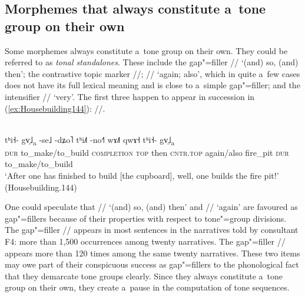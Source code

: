 \subsection[Morphemes that constitute a~tone group on their own]{Morphemes that always constitute a~tone group on their own}
\label{sec:someelementsalwaysconstituteatonegroupontheirown}

Some morphemes always constitute a~tone group on their own. They could be referred to as \textit{tonal standalones}. These include the gap"=filler //
‘(and) so, (and) then’; the
contrastive topic marker //; // ‘again; also’, which in quite a~few cases does not have its full
lexical meaning and is close to a~simple gap"=filler; and the intensifier // ‘very’. The first three happen to appear in succession in (\ref{ex:Housebuilding144}): //.

\begin{exe}
	\ex
	\label{ex:Housebuilding144}
	\\
	\gll tʰi˧-		gv̩˩\textsubscript{a}	-se˩	-dʑo˥	tʰi˩˥	-no˧˥	wɤ˩˥		qwɤ˧	tʰi˧-	gv̩˩\textsubscript{a}\\
	\textsc{dur}		to\_make/to\_build	\textsc{completion}			\textsc{top}	then	\textsc{cntr.top}		again/also	fire\_pit		\textsc{dur}	to\_make/to\_build\\
	\glt ‘After one has finished to build [the cupboard], well, one builds the fire pit!’ (Housebuilding.144)
\end{exe}

One could speculate that // ‘(and) so, (and) then’ and // ‘again’ are favoured
as gap"=fillers because of their properties with respect to tone"=group divisions. The gap"=filler
// appears in most sentences in the narratives told by consultant F4: more than 1,500
occurrences among twenty narratives. The gap"=filler // appears more than 120 times among the
same twenty narratives. These two items may owe part of their conspicuous success as gap"=fillers to the
phonological fact that they demarcate tone groups clearly. Since they always constitute a~tone group
on their own, they create a~pause in the computation of tone sequences.

